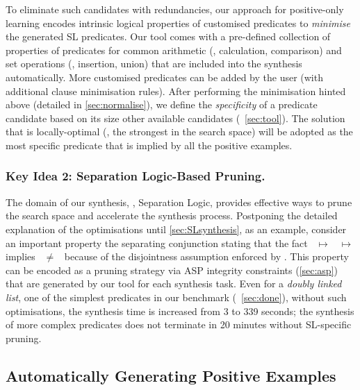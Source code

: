 To eliminate such candidates with redundancies, our approach for
positive-only learning encodes intrinsic logical properties of customised
predicates to \emph{minimise} the generated SL predicates.
%
Our tool comes with a pre-defined collection of properties of
predicates for common arithmetic (\eg, calculation, comparison) and
set operations (\eg, insertion, union) that are included into the
synthesis automatically.
%
More customised predicates can be added
by the user (with additional clause minimisation rules). 
%
After performing the minimisation hinted above (detailed in
\autoref{sec:normalise}), we define the \emph{specificity} of a predicate
candidate based on its size \wrt other available candidates
(\cf~\autoref{sec:tool}). The solution that is locally-optimal (\ie, the
strongest in the search space) will be adopted as the most specific predicate that is implied by
all the positive examples.



\subsubsection{Key Idea 2: Separation Logic-Based Pruning.}
\label{sec:pruning}



The domain of our synthesis, \ie, Separation Logic, provides effective
ways to prune the search space and accelerate the synthesis process. 
%
Postponing the detailed explanation of the optimisations until
\autoref{sec:SLsynthesis}, as an example, consider an important
property the separating conjunction stating that the fact
~$\mapsto$~ $\mapsto$  implies
~$\neq$~ because of the disjointness assumption
enforced by \code{*}.
%
This property can be encoded as a pruning strategy via ASP integrity
constraints (\autoref{sec:asp}) that are generated by our tool for
each synthesis task.
%
%
Even for a \emph{doubly linked list}, one of the simplest predicates
in our benchmark (\cf~\autoref{sec:done}), without such optimisations,
the synthesis time is increased from 3 to 339 seconds; the synthesis
of more complex predicates does not terminate in 20 minutes without
SL-specific pruning.

\subsection{Automatically Generating Positive Examples}


